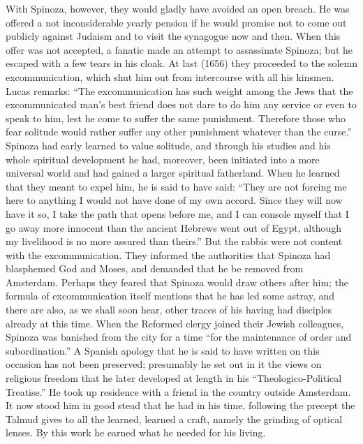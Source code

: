\documentclass[12pt]{book}
\newcommand{\opage}[1]{\marginnote{\footnotesize\textit{[#1]}}}
\begin{document}
With Spinoza, however, they would gladly have avoided an open breach. He was offered
a not inconsiderable yearly pension if he would promise not to come out publicly
against Judaism and to visit the synagogue now and then. When this offer was not
accepted, a fanatic made an attempt to assassinate Spinoza; but he escaped with a few
tears in his cloak. At last (1656) they proceeded to the solemn excommunication,
which shut him out from intercourse with all his kinsmen. Lucas remarks: ``The
excommunication has such weight among the Jews that the excommunicated man's best
friend does not dare to do him any service or even to speak to him, lest he come to
suffer the same punishment. Therefore those who fear solitude would rather suffer any
other punishment whatever than the curse.'' Spinoza had early learned to value
solitude, and through his studies and his whole spiritual development he had,
moreover, been initiated into a more universal world and had gained a larger
spiritual fatherland. When he learned that they meant to expel him, he is said to
have said: ``They are not forcing me here to anything I would not have done of my own
accord. Since they will now have it so, I take the path that opens before me, and I
can console myself that I go away more innocent than the ancient Hebrews went out of
Egypt, although my livelihood is no more assured than theirs.'' But the rabbis were
not content with the excommunication. They \opage{26}informed the authorities that
Spinoza had blasphemed God and Moses, and demanded that he be removed from Amsterdam.
Perhaps they feared that Spinoza would draw others after him; the formula of
excommunication itself mentions that he has led some astray, and there are also, as
we shall soon hear, other traces of his having had disciples already at this time.
When the Reformed clergy joined their Jewish colleagues, Spinoza was banished from the
city for a time ``for the maintenance of order and subordination.'' A Spanish apology
that he is said to have written on this occasion has not been preserved; presumably
he set out in it the views on religious freedom that he later developed at length in
his ``Theologico-Political Treatise.'' He took up residence with a friend in the
country outside Amsterdam. It now stood him in good stead that he had in his time,
following the precept the Talmud gives to all the learned, learned a craft, namely
the grinding of optical lenses. By this work he earned what he needed for his living.
\end{document}
